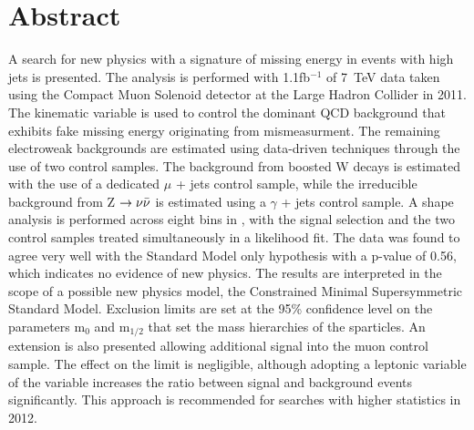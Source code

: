 \chapter*{Abstract}
\noindent 
\vspace{0mm}
\normalsize

A search for new physics with a signature of missing energy in events with high \Pt jets is presented. The analysis is performed with 1.1fb$^{-1}$ of 7~TeV data taken using the Compact Muon Solenoid detector at the Large Hadron Collider in 2011. The kinematic variable \alt is used to control the dominant QCD background that exhibits fake missing energy originating from mismeasurment. The remaining electroweak backgrounds are estimated using data-driven techniques through the use of two control samples. The background from boosted W decays is estimated with the use of a dedicated $\mu$ + jets control sample, while the irreducible background from Z $\rightarrow \nu \bar{\nu}$ is estimated using a $\gamma$ + jets control sample.  A shape analysis is performed across eight bins in \HT, with the signal selection and the two control samples treated simultaneously in a likelihood fit.  The data was found to agree very well with the Standard Model only hypothesis with a p-value of 0.56, which indicates no evidence of new physics. The results are interpreted in the scope of a possible new physics model, the Constrained Minimal Supersymmetric Standard Model. Exclusion limits are set at the 95\% confidence level on the parameters m$_{0}$ and m$_{1/2}$ that set the mass hierarchies of the sparticles. An extension is also presented allowing additional signal into the muon control sample. The effect on the limit is negligible, although adopting a leptonic variable of the \alt variable increases the ratio between signal and background events significantly. This approach is recommended for searches with higher statistics in 2012. 



